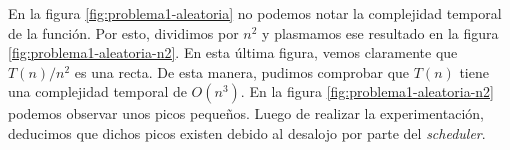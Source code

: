 En la figura \ref{fig:problema1-aleatoria} no podemos notar la complejidad temporal de la función. Por esto, dividimos por $n^2$ y plasmamos ese resultado en la figura \ref{fig:problema1-aleatoria-n2}. En esta última figura, vemos claramente que $T(n) / n ^ 2$ es una recta. De esta manera, pudimos comprobar que $T(n)$ tiene una complejidad temporal de $O(n^3)$. En la figura \ref{fig:problema1-aleatoria-n2} podemos observar unos picos pequeños. Luego de realizar la experimentación, deducimos que dichos picos existen debido al desalojo por parte del \emph{scheduler}.
